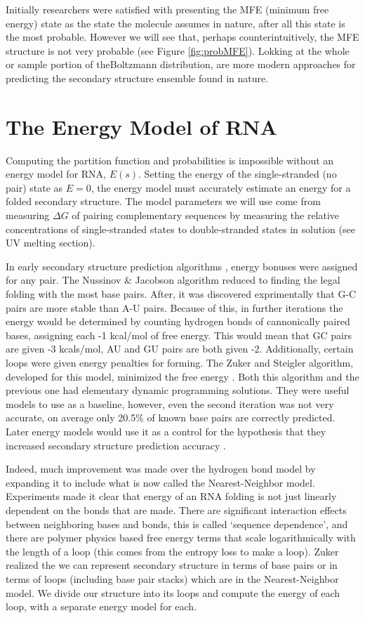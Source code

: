 Initially researchers were satisfied with presenting the MFE (minimum
free energy) state as the state the molecule assumes in nature, after
all this state is the most probable. However we will see that, perhaps
counterintuitively, the MFE structure is not very probable (see Figure
\ref{fig:probMFE}). Lokking at the whole or sample portion of
theBoltzmann distribution, are more modern approaches for predicting
the secondary structure ensemble found in nature.

\section{The Energy Model of RNA}

Computing the partition function and probabilities is impossible
without an energy model for RNA, $E(s)$. Setting the energy of the
single-stranded (no pair) state as $E = 0$, the energy model must
accurately estimate an energy for a folded secondary structure. The
model parameters we will use come from measuring $\Delta G$ of pairing
complementary sequences by measuring the relative concentrations of
single-stranded states to double-stranded states in solution (see UV
melting section).

In early secondary structure prediction algorithms
\cite{nussinov1980fast}, energy bonuses were assigned for any pair.
The Nussinov \& Jacobson algorithm reduced to finding the legal
folding with the most base pairs. After, it was discovered
exprimentally that G-C pairs are more stable than A-U pairs. Because
of this, in further iterations the energy would be determined by
counting hydrogen bonds of cannonically paired bases, assigning each
-1 kcal/mol of free energy. This would mean that GC pairs are given -3
kcals/mol, AU and GU pairs are both given -2. Additionally, certain
loops were given energy penalties for forming. The Zuker and Steigler
algorithm, developed for this model, minimized the free energy
\cite{zuker1981optimal}. Both this algorithm and the previous one had
elementary dynamic programming solutions. They were useful models to
use as a baseline, however, even the second iteration was not very
accurate, on average only 20.5\% of known base pairs are correctly
predicted. Later energy models would use it as a control for the
hypothesis that they increased secondary structure prediction accuracy
\cite{mathews1999expanded}.

Indeed, much improvement was made over the hydrogen bond model by
expanding it to include what is now called the Nearest-Neighbor
model. Experiments made it clear that energy of an RNA folding is not
just linearly dependent on the bonds that are made. There are
significant interaction effects between neighboring bases and bonds,
this is called `sequence dependence', and there are polymer physics
based free energy terms that scale logarithmically with the length of
a loop (this comes from the entropy loss to make a loop). Zuker
realized the we can represent secondary structure in terms of base
pairs or in terms of loops (including base pair stacks) which are in
the Nearest-Neighbor model. We divide our structure into its loops and
compute the energy of each loop, with a separate energy model for
each.




